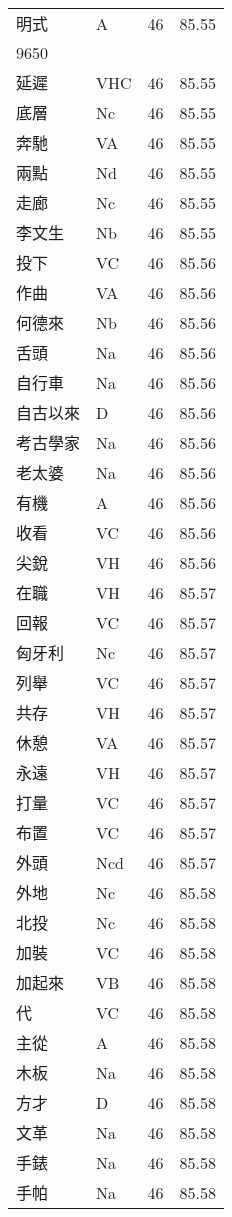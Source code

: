 \documentclass[twocolumn]{book}
\begin{document}
\begin{supertabular}{llrr}
明式 & A & 46 &  85.55\\
9650\\
延遲 & VHC & 46 &  85.55\\
底層 & Nc & 46 &  85.55\\
奔馳 & VA & 46 &  85.55\\
兩點 & Nd & 46 &  85.55\\
走廊 & Nc & 46 &  85.55\\
李文生 & Nb & 46 &  85.55\\
投下 & VC & 46 &  85.56\\
作曲 & VA & 46 &  85.56\\
何德來 & Nb & 46 &  85.56\\
舌頭 & Na & 46 &  85.56\\
自行車 & Na & 46 &  85.56\\
自古以來 & D & 46 &  85.56\\
考古學家 & Na & 46 &  85.56\\
老太婆 & Na & 46 &  85.56\\
有機 & A & 46 &  85.56\\
收看 & VC & 46 &  85.56\\
尖銳 & VH & 46 &  85.56\\
在職 & VH & 46 &  85.57\\
回報 & VC & 46 &  85.57\\
匈牙利 & Nc & 46 &  85.57\\
列舉 & VC & 46 &  85.57\\
共存 & VH & 46 &  85.57\\
休憩 & VA & 46 &  85.57\\
永遠 & VH & 46 &  85.57\\
打量 & VC & 46 &  85.57\\
布置 & VC & 46 &  85.57\\
外頭 & Ncd & 46 &  85.57\\
外地 & Nc & 46 &  85.58\\
北投 & Nc & 46 &  85.58\\
加裝 & VC & 46 &  85.58\\
加起來 & VB & 46 &  85.58\\
代 & VC & 46 &  85.58\\
主從 & A & 46 &  85.58\\
木板 & Na & 46 &  85.58\\
方才 & D & 46 &  85.58\\
文革 & Na & 46 &  85.58\\
手錶 & Na & 46 &  85.58\\
手帕 & Na & 46 &  85.58\\

\end{supertabular}
\end{document}
